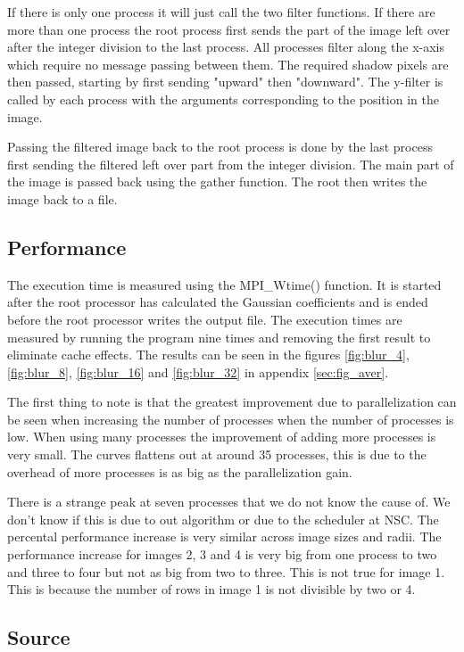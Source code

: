 \documentclass[a4paper, 12pt]{article}
\begin{document}
If there is only one process it will just call the two filter functions. If
there are more than one process the root process first sends the part of the
image left over after the integer division to the last process. All processes
filter along the x-axis which require no message passing between them.
The required shadow pixels are then passed, starting by first sending "upward"
then "downward". The y-filter is called by each process with the arguments 
corresponding to the position in the image. 

Passing the filtered image back to the root process is done by the last process 
first sending the filtered left over part from the integer division. The main
part of the image is passed back using the gather function.
The root then writes the image back to a file.
 

\subsection{Performance}
The execution time is measured using the MPI\_Wtime() function. It is started
after the root processor has calculated the Gaussian
coefficients and is ended before the root processor writes the output file.
The execution times are measured by running the program nine times and removing the
first result to eliminate cache effects. The results can be seen in the figures
\ref{fig:blur_4}, \ref{fig:blur_8}, \ref{fig:blur_16} and \ref{fig:blur_32} in
appendix \ref{sec:fig_aver}.

The first thing to note is that the greatest improvement due to parallelization
can be seen when increasing the number of processes when the number of processes
is low. When using many processes the improvement of adding more processes is
very small. The curves flattens out at around 35 processes, this is due to the
overhead of more processes is as big as the parallelization gain.

There is a strange peak at seven processes that we do not know the cause of. We don't
know if this is due to out algorithm or due to the scheduler at NSC.
The percental performance increase is very similar across image sizes and radii.
The performance increase for images 2, 3 and 4 is very big from one process to
two and three to four but not as big from two to three. This is not true for image 1. This is
because the number of rows in image 1 is not divisible by two or 4.

\subsection{Source}
\end{document}
